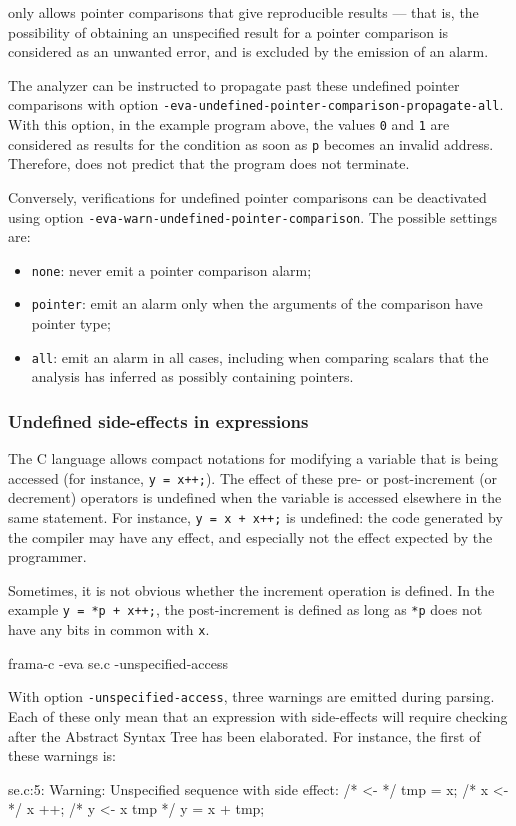 \documentclass{frama-c-book}
\begin{document}
\Eva{} only allows pointer comparisons that give
reproducible results --- that is, the possibility of obtaining an
unspecified result for a pointer comparison is considered as an
unwanted error, and is excluded by the emission of an alarm.

The analyzer can be instructed to propagate past these undefined
pointer comparisons with
option \lstinline|-eva-undefined-pointer-comparison-propagate-all|.
With this option, in the example program above,
the values \lstinline|0| and \lstinline|1| are considered as results
for the condition as soon as \lstinline|p| becomes an invalid address.
Therefore, \Eva{} does not predict that the program
does not terminate.

Conversely, verifications for undefined pointer comparisons can be
deactivated using option \lstinline|-eva-warn-undefined-pointer-comparison|.
The possible settings are:
\begin{itemize}
\item \lstinline|none|: never emit a pointer comparison alarm;
\item \lstinline|pointer|: emit an alarm only when the arguments of the
comparison have pointer type;
\item \lstinline|all|: emit an alarm in all cases, including when comparing
scalars that the analysis has inferred as possibly containing pointers.
\end{itemize}


\subsubsection{Undefined side-effects in expressions}
The C language allows compact notations for modifying a variable that
is being accessed (for instance, \lstinline|y = x++;|).  The effect of
these pre- or post-increment (or decrement) operators is undefined
when the variable is accessed elsewhere in the same statement. For
instance, \lstinline|y = x + x++;| is undefined: the code generated by
the compiler may have any effect, and especially not the effect
expected by the programmer.

Sometimes, it is not obvious whether the increment operation is defined. In
the example \lstinline|y = *p + x++;|, the post-increment is defined
as long as \lstinline|*p| does not have any bits in common with
\lstinline|x|.

\begin{frama-c-commands}
frama-c -eva se.c -unspecified-access
\end{frama-c-commands}
With option \verb|-unspecified-access|, three warnings are emitted during
parsing. Each of these only mean that an expression with side-effects
will require checking after the Abstract Syntax Tree has been elaborated.
For instance, the first of these warnings is:
\begin{logs}
[kernel] se.c:5: Warning:
  Unspecified sequence with side effect:
  /*  <-  */
  tmp = x;
  /* x <-  */
  x ++;
  /* y <- x tmp */
  y = x + tmp;
\end{logs}
\end{document}
